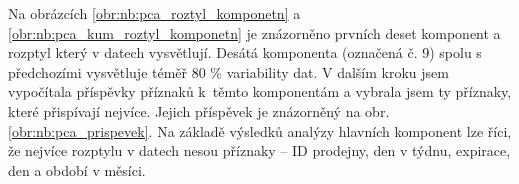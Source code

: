 Na obrázcích \ref*{obr:nb:pca_roztyl_komponetn} a \ref*{obr:nb:pca_kum_roztyl_komponetn} je znázorněno prvních deset komponent a rozptyl který v datech vysvětlují. 
Desátá komponenta (označená č. 9) spolu s předchozími vysvětluje téměř 80 \% variability dat. V dalším kroku jsem vypočítala příspěvky příznaků k~těmto komponentám a vybrala jsem ty příznaky, které přispívají nejvíce. Jejich příspěvek je znázorněný na obr. \ref*{obr:nb:pca_prispevek}. Na základě výsledků analýzy hlavních komponent lze říci, že nejvíce rozptylu v datech nesou příznaky -- ID prodejny, den v týdnu, expirace, den a období v měsíci.

